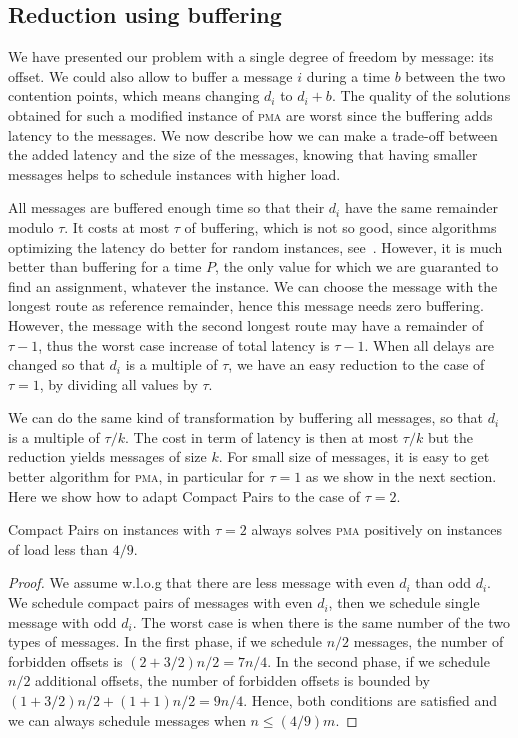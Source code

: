 \documentclass[a4paper,UKenglish,cleveref, autoref, thm-restate]{lipics-v2019}
\newcommand\pma{\textsc{pma}\xspace}
\begin{document}
\subsection{Reduction using buffering}

We have presented our problem with a single degree of freedom by message: its
offset. We could also allow to buffer a message $i$ during a time $b$ between the two contention points, which means changing $d_i$ to $d_i + b$. The quality of the solutions obtained for such a modified instance of \pma are worst since the buffering adds latency to the messages. We now describe how we can make a trade-off between the added latency and the size of the messages, knowing that having smaller messages helps to schedule instances with higher load.


All messages are buffered enough time so that their $d_i$ have the same
remainder modulo $\tau$. It costs at most $\tau$ of buffering, which is not
so good, since algorithms optimizing the latency do better for random instances, see~\cite{barth2018deterministic}. However, it is much better than buffering for a time $P$, the only value for which we are guaranted to find an assignment, whatever the instance. We can choose the message with the longest route as reference remainder, hence this message needs zero buffering. However, the message with the second longest route may have a remainder of $\tau -1$, thus the worst case increase of total latency is $\tau -1$. When all delays are changed so that $d_i$ is a multiple of $\tau$, we have an easy reduction to the case of $\tau = 1$, by dividing all values by $\tau$.

We can do the same kind of transformation by buffering all 
messages, so that $d_i$ is a multiple of $\tau / k$. The cost in term
of latency is then at most $\tau / k$ but the reduction yields messages of size $k$.
For small size of messages, it is easy to get better algorithm for \pma, in particular for $\tau = 1$ as we show in the next section. Here we show how to adapt Compact Pairs to the case of $\tau = 2$.

\begin{theorem}
Compact Pairs on instances with $\tau =2$ always solves \pma positively on instances of load less than $4/9$.
\end{theorem}
\begin{proof}
We assume w.l.o.g that there are less message with even $d_i$ than odd $d_i$.
We schedule compact pairs of messages with even $d_i$, then we schedule single message with odd $d_i$. The worst case is when there is the same number of the two types of messages. In the first phase, if we schedule
 $n/2$ messages, the number of forbidden offsets is $(2 + 3/2)n/2 = 7n/4$. In the second phase,
 if we schedule $n/2$ additional offsets, the number of forbidden offsets is bounded by 
$ (1 + 3/2) n/2  + (1 + 1)n/2 = 9n/4$.
Hence, both conditions are satisfied and we can always schedule messages when $n \leq (4/9)m$.
\end{proof}
\end{document}

